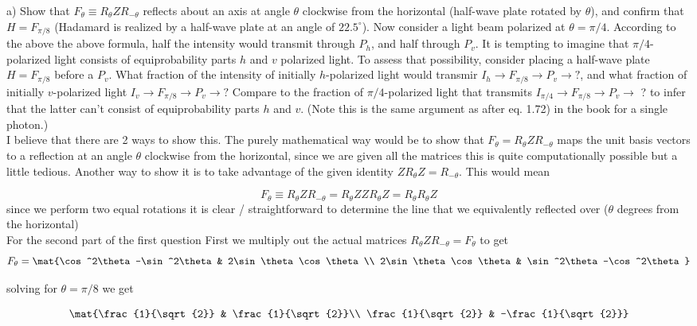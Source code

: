 a) Show that $F_\theta\equiv R_\theta Z R_{-\theta}$ reflects about an axis at
angle $\theta$ clockwise from the horizontal (half-wave plate rotated by
$\theta$), and confirm that $H=F_{\pi/8}$ (Hadamard is realized by a half-wave
plate at an angle of $22.5^\circ$). Now consider a light beam polarized at
$\theta=\pi/4$. According to the above the above formula, half the intensity
would transmit through $P_h$, and half through $P_v$. It is tempting to
imagine that $\pi/4$-polarized light consists of equiprobability parts $h$ and
$v$ polarized light. To assess that possibility, consider placing a half-wave
plate $H=F_{\pi/8}$ before a $P_v$. What fraction of the intensity of initially $h$-polarized light would transmir $I_h\rightarrow F_{\pi/8}\rightarrow P_v\rightarrow ?$, and what fraction of initially $v$-polarized light $I_v\rightarrow F_{\pi/8}\rightarrow P_v\rightarrow ?$ Compare to the fraction of $\pi/4$-polarized light that transmits $I_{\pi/4}\rightarrow F_{\pi/8}\rightarrow P_v\rightarrow$ ? to infer that the latter can't consist of equiprobability parts $h$ and $v$. (Note this is the same argument as after eq. 1.72) in the book for a single photon.)\\

I believe that there are 2 ways to show this. The purely mathematical way
would be to show that $F_\theta=R_\theta Z R_{-\theta}$ maps the unit basis
vectors to a reflection at an angle $\theta$ clockwise from the horizontal,
since we are given all the matrices this is quite computationally possible but a
little tedious. Another way to show it is to take advantage of the given
identity $ZR_\theta Z=R_{-\theta}$. This would mean

$$F_\theta\equiv R_\theta Z R_{-\theta}=R_\theta ZZ R_\theta Z = R_\theta
R_\theta Z$$
since we perform two equal rotations it is clear / straightforward to
determine the line that we equivalently reflected over ($\theta$ degrees from
the horizontal)\\

For the second part of the first question First we multiply out the actual
matrices $R_\theta Z R_{-\theta}=F_\theta$ to get
$$F_\theta=\mat{\cos^2\theta-\sin^2\theta & 2\sin\theta\cos\theta\\
2\sin\theta\cos\theta & \sin^2\theta-\cos^2\theta}$$

solving for $\theta=\pi/8$ we get

$$\mat{\frac{1}{\sqrt{2}} & \frac{1}{\sqrt{2}}\\ \frac{1}{\sqrt{2}} &
-\frac{1}{\sqrt{2}}}$$

